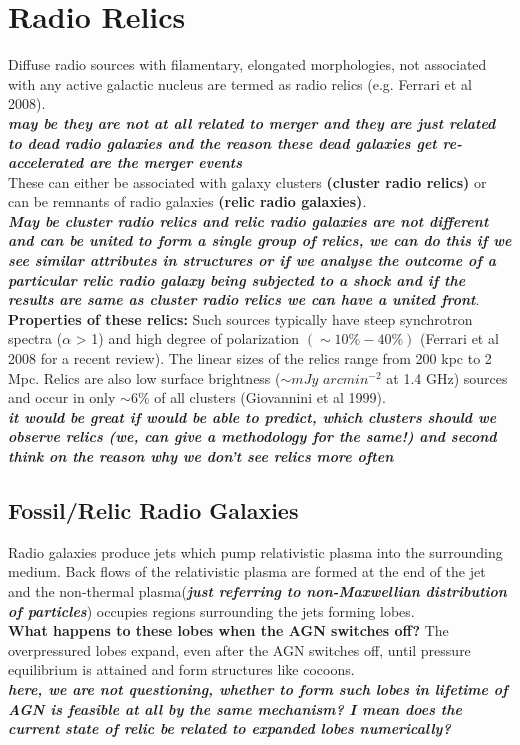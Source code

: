 \documentclass[12pt]{report}
\newcommand{\tbf}[1]{\textbf{#1}}
\newcommand{\tit}[1]{\textit{#1}}
\begin{document}
\section{Radio Relics}
Diffuse radio sources with filamentary, elongated morphologies, not associated with any active galactic nucleus are termed as radio relics (e.g. Ferrari et al 2008). \\
\textbf{\tit{may be they are not at all related to merger and they are just related to dead radio galaxies and the reason these dead galaxies get re-accelerated are the merger events}}\\
These can either be associated with galaxy clusters \tbf{(cluster radio relics)} or can be remnants of radio galaxies \tbf{(relic radio galaxies)}.\\
\textbf{\tit{May be cluster radio relics and relic radio galaxies are not different and can be united to form a single group of relics, we can do this if we see similar attributes in structures or if we analyse the outcome of a particular relic radio galaxy being subjected to a shock and if the results are same as cluster radio relics we can have a united front}}.\\
\textbf{Properties of these relics:}
Such sources typically have steep synchrotron spectra ($\alpha$ > 1) and high degree of polarization $(\sim 10\% - 40\%)$ (Ferrari et al 2008 for a recent review). The linear sizes of the relics range from
200 kpc to 2 Mpc. Relics are also low surface brightness ($\sim mJy$ $arcmin^{-2}$ at 1.4 GHz) sources and occur in only $\sim 6\%$ of all clusters (Giovannini et al 1999). \\
\textbf{\tit{it would be great if would be able to predict, which clusters should we observe relics (we, can give a methodology for the same!) and second think on the reason why we don't see relics more often}}
\subsection{Fossil/Relic Radio Galaxies}
Radio galaxies produce jets which pump relativistic plasma into the surrounding medium. Back flows of the relativistic plasma are formed at the end of the jet and the non-thermal plasma(\tbf{\tit{just referring to non-Maxwellian distribution of particles}}) occupies regions surrounding the jets forming lobes.\\
\textbf{What happens to these lobes when the AGN switches off?}
 The overpressured lobes expand, even after the AGN switches off, until pressure equilibrium is attained and form structures like cocoons.\\
\tbf{\tit{here, we are not questioning, whether to form such lobes in lifetime of AGN is feasible at all by the same mechanism? I mean does the current state of relic be related to expanded lobes numerically?}}\\ 
 
\end{document}
